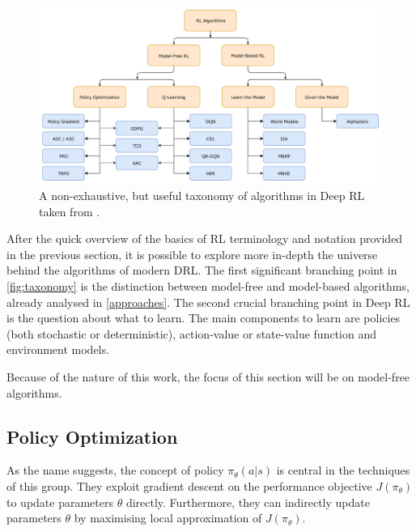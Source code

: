 \begin{figure}
	\centering
	\includegraphics[width=\textwidth]{img/taxonomy.png}
	\caption{A non-exhaustive, but useful taxonomy of algorithms in Deep RL taken from \cite{openai2018spinningup}.}
	\label{fig:taxonomy}
\end{figure}

After the quick overview of the basics of RL terminology and notation provided in the previous section, it is possible to explore more in-depth the universe behind the algorithms of modern DRL. The first significant branching point in \vref{fig:taxonomy} is the distinction between model-free and model-based algorithms, already analysed in \vref{approaches}. 
The second crucial branching point in Deep RL is the question about what to learn. The main components to learn are policies (both stochastic or deterministic), action-value or state-value function and environment models.

Because of the nature of this work, the focus of this section will be on model-free algorithms.

\subsection{Policy Optimization}

As the name suggests, the concept of policy  $\pi_\theta(a|s)$ is central in the techniques of this group. They exploit gradient descent on the performance objective $J(\pi_\theta)$ to update parameters $\theta$ directly. Furthermore, they can indirectly update parameters $\theta$ by maximising local approximation of $J(\pi_\theta)$.

